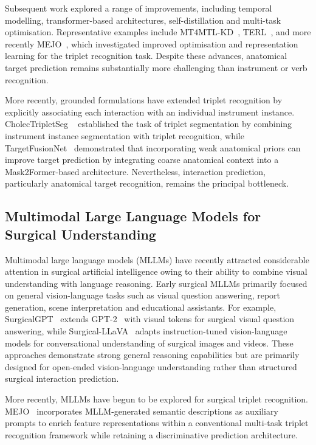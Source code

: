\documentclass[11pt]{article}
\begin{document}
Subsequent work explored a range of improvements, including temporal modelling, transformer-based architectures, self-distillation and multi-task optimisation. Representative examples include MT4MTL-KD~\cite{gui2023mt4mtl}, TERL~\cite{gui2024tail}, and more recently MEJO~\cite{zhang2025mejo}, which investigated improved optimisation and representation learning for the triplet recognition task. Despite these advances, anatomical target prediction remains substantially more challenging than instrument or verb recognition.

More recently, grounded formulations have extended triplet recognition by explicitly associating each interaction with an individual instrument instance. CholecTripletSeg ~\cite{alabi2026grounding} established the task of triplet segmentation by combining instrument instance segmentation with triplet recognition, while TargetFusionNet~\cite{alabi2026grounding} demonstrated that incorporating weak anatomical priors can improve target prediction by integrating coarse anatomical context into a Mask2Former-based architecture. Nevertheless, interaction prediction, particularly anatomical target recognition, remains the principal bottleneck.

\subsection{Multimodal Large Language Models for Surgical Understanding}
Multimodal large language models (MLLMs) have recently attracted considerable attention in surgical artificial intelligence owing to their ability to combine visual understanding with language reasoning. Early surgical MLLMs primarily focused on general vision-language tasks such as visual question answering, report generation, scene interpretation and educational assistants. For example, SurgicalGPT~\cite{seenivasan2023surgicalgpt} extends GPT-2~\cite{radford2019language} with visual tokens for surgical visual question answering, while Surgical-LLaVA~\cite{jin2024surgical} adapts instruction-tuned vision-language models for conversational understanding of surgical images and videos. These approaches demonstrate strong general reasoning capabilities but are primarily designed for open-ended vision-language understanding rather than structured surgical interaction prediction.

More recently, MLLMs have begun to be explored for surgical triplet recognition. MEJO~\cite{zhang2025mejo} incorporates MLLM-generated semantic descriptions as auxiliary prompts to enrich feature representations within a conventional multi-task triplet recognition framework while retaining a discriminative prediction architecture.
\end{document}
